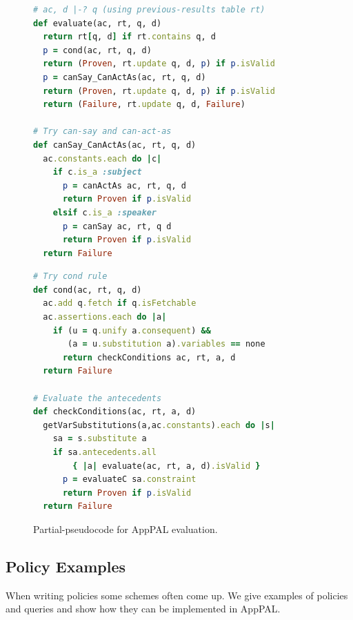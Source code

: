 \documentclass[]{llncs}
\begin{document}
\begin{figure}
\begin{minipage}[b]{0.5\linewidth}
\begin{lstlisting}[language=Ruby, basicstyle=\ttfamily\scriptsize, keywordstyle=\scriptsize\slshape, columns=flexible]
# ac, d |-? q (using previous-results table rt)
def evaluate(ac, rt, q, d)
  return rt[q, d] if rt.contains q, d
  p = cond(ac, rt, q, d)
  return (Proven, rt.update q, d, p) if p.isValid
  p = canSay_CanActAs(ac, rt, q, d)
  return (Proven, rt.update q, d, p) if p.isValid
  return (Failure, rt.update q, d, Failure)

# Try can-say and can-act-as
def canSay_CanActAs(ac, rt, q, d)
  ac.constants.each do |c|
    if c.is_a :subject
      p = canActAs ac, rt, q, d
      return Proven if p.isValid
    elsif c.is_a :speaker
      p = canSay ac, rt, q d
      return Proven if p.isValid
  return Failure
\end{lstlisting}
\end{minipage}
\begin{minipage}[b]{0.5\linewidth}
\begin{lstlisting}[language=Ruby, basicstyle=\ttfamily\scriptsize, keywordstyle=\scriptsize\slshape, columns=flexible]
# Try cond rule
def cond(ac, rt, q, d)
  ac.add q.fetch if q.isFetchable
  ac.assertions.each do |a|
    if (u = q.unify a.consequent) &&
       (a = u.substitution a).variables == none
      return checkConditions ac, rt, a, d
  return Failure

# Evaluate the antecedents
def checkConditions(ac, rt, a, d)
  getVarSubstitutions(a,ac.constants).each do |s|
    sa = s.substitute a
    if sa.antecedents.all
        { |a| evaluate(ac, rt, a, d).isValid }
      p = evaluateC sa.constraint
      return Proven if p.isValid
  return Failure
\end{lstlisting}
\end{minipage}
\caption{Partial-pseudocode for AppPAL evaluation.}
\label{fig:pseudocode}
\end{figure}

\subsection{Policy Examples}
\label{ssec:idioms}

When writing policies some schemes often come up.
We give examples of policies and queries and show how they can be implemented in AppPAL.
\end{document}

